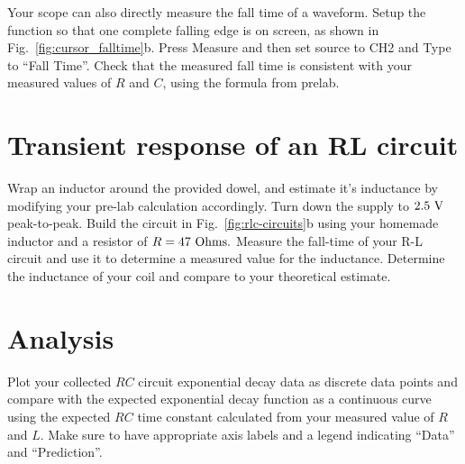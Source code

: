 Your scope can also directly measure the fall time of a waveform.
Setup the function so that one complete falling edge is on screen, as
shown in Fig.~\ref{fig:cursor_falltime}b.  Press Measure and then set
source to CH2 and Type to ``Fall Time''.  Check that the measured fall
time is consistent with your measured values of $R$ and $C$, using the
formula from prelab.


\section{Transient response of an RL circuit}

Wrap an inductor around the provided dowel, and estimate it's
inductance by modifying your pre-lab calculation accordingly.  Turn
down the supply to $2.5~\rm V$ peak-to-peak.  Build the circuit in
Fig.~\ref{fig:rlc-circuits}b using your homemade inductor and a
resistor of $R=47~\rm Ohms.$ Measure the fall-time of your R-L circuit
and use it to determine a measured value for the inductance.
Determine the inductance of your coil and compare to your theoretical
estimate.

\section{Analysis}

Plot your collected $RC$ circuit exponential decay data as discrete
data points and compare with the expected exponential decay function
as a continuous curve using the expected $RC$ time constant calculated
from your measured value of $R$ and $L$.  Make sure to have
appropriate axis labels and a legend indicating ``Data'' and
``Prediction''.


